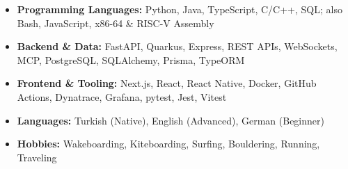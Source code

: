 \documentclass[a4paper]{article}
\newcommand{\desc}[1]{%
    {\fontsize{8.0}{10.2}\selectfont #1}%
}
\begin{document}
\begin{itemize}[leftmargin=1.1em, itemsep=0.5pt, parsep=0pt, topsep=0.6pt]
    \item \desc{\textbf{Programming Languages:} Python, Java, TypeScript, C/C++, SQL; also Bash, JavaScript, x86-64 \& RISC-V Assembly}
    \item \desc{\textbf{Backend \& Data:} FastAPI, Quarkus, Express, REST APIs, WebSockets, MCP, PostgreSQL, SQLAlchemy, Prisma, TypeORM}
    \item \desc{\textbf{Frontend \& Tooling:} Next.js, React, React Native, Docker, GitHub Actions, Dynatrace, Grafana, pytest, Jest, Vitest}
    \item \desc{\textbf{Languages:} Turkish (Native), English (Advanced), German (Beginner)}
    \item \desc{\textbf{Hobbies:} Wakeboarding, Kiteboarding, Surfing, Bouldering, Running, Traveling}
\end{itemize}
\end{document}
